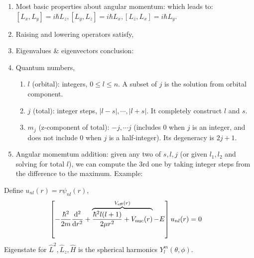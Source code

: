 \documentclass{school-22.101-notes}
\begin{document}
  \begin{enumerate}
  \item Most basic properties about angular momentum:
    which leads to: $[L_x, L_y] = i \hbar L_z, [L_y, L_z] = i \hbar L_x, [L_z, L_x] = i \hbar L_y$. 

  \item Raising and lowering operators satisfy,

  \item Eigenvalues \& eigenvectors conclusion: 

\item Quantum numbers, 
  \begin{enumerate}
  \item $l$ (orbital): integers, $0 \le l \le n$. A subset of $j$ is the solution from orbital component. 
  \item $j$ (total): integer steps, $|l-s|, \cdots, |l+s|$. It completely construct $l$ and $s$. 
  \item $m_j$ (z-component of total): $-j, \cdots j$ (includes 0 when $j$ is an integer, and does not include 0 when $j$ is a half-integer). Its degeneracy is $2j+1$. 
  \end{enumerate}

\item Angular momemtum addition: given any two of $s, l, j$ (or given $l_1, l_2$ and solving for total $l$), we can compute the 3rd one by taking integer steps from the difference to the maximum. Example: 
  \end{enumerate}





Define $u_{nl} (r) = r \psi_{nl} (r)$,
\begin{align}
\left[ - \frac{\hbar^2}{2m} \frac{\mathrm{d}^{2}}{\mathrm{d}r^{2}} + \overbrace{\frac{\hbar^2 l (l+1)}{2 \mu r^2} + V_{\mathrm{nuc}} (r) }^{V_{\mathrm{eff}} (r)} - E \right] u_{nl} (r) &= 0 
\end{align}
Eigenstate for $\hat{L}^2, \hat{L}_z, \hat{H}$ is the spherical harmonics $Y_l^m (\theta, \phi)$. 
\end{document}
